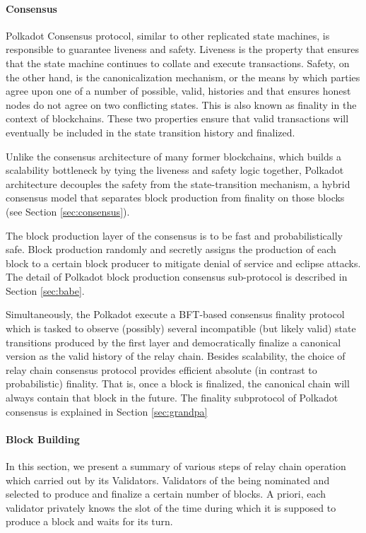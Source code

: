 \paragraph{Consensus}

Polkadot Consensus protocol, similar to other replicated state machines, is responsible to guarantee liveness and safety. Liveness is the property that ensures that the state machine continues to collate and execute transactions. Safety, on the other hand, is the canonicalization mechanism, or the means by which parties agree upon one of a number of possible, valid, histories and that ensures honest nodes do not agree on two conflicting states. This is also known as finality in the context of blockchains. These two properties ensure that valid transactions will eventually be included in the state transition
history and finalized.

Unlike the consensus architecture of many former blockchains, which builds a scalability bottleneck by tying the liveness and safety logic together, Polkadot architecture decouples the safety from the state-transition mechanism, a hybrid consensus model that separates block production from finality on those blocks (see Section \ref{sec:consensus}).

The block production layer of the consensus is to be fast and probabilistically safe. Block production randomly and secretly assigns the production of each block to a certain block producer to mitigate denial of service and eclipse attacks. The detail of Polkadot block production consensus sub-protocol is described in Section \ref{sec:babe}.

Simultaneously, the Polkadot execute a BFT-based consensus finality protocol which is tasked to observe (possibly) several incompatible (but likely valid) state transitions produced by the first layer and democratically finalize a canonical version as the valid history of the relay chain. Besides scalability, the choice of relay chain consensus protocol provides efficient absolute (in contrast to probabilistic) finality. That is, once a block is finalized, the canonical chain will always contain that block in the future. The finality subprotocol of Polkadot consensus is explained in Section
\ref{sec:grandpa}

\paragraph{Block Building}\label{sec:relaychainblockproduction}
In this section, we present a summary of various steps of relay chain operation which carried out by its Validators. Validators of the being nominated and selected to produce and finalize a certain number of blocks. A priori, each validator privately knows the slot of the time during which it is supposed to produce a block and waits for its turn.

